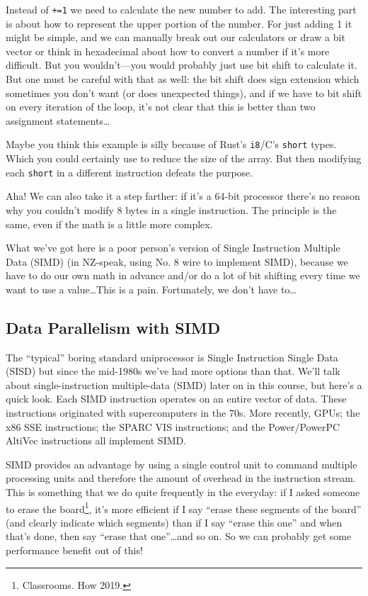 Instead of \texttt{+=1} we need to calculate the new number to add. The interesting part is about how to represent the upper portion of the number. For just adding 1 it might be simple, and we can manually break out our calculators or draw a bit vector or think in hexadecimal about how to convert a number if it's more difficult. But you wouldn't---you would probably just use bit shift to calculate it. But one must be careful with that as well: the bit shift does sign extension which sometimes you don't want (or does unexpected things), and if we have to bit shift on every iteration of the loop, it's not clear that this is better than two assignment statements\ldots

Maybe you think this example is silly because of Rust's \texttt{i8}/C's \texttt{short} types. Which you could certainly use to reduce the size of the array. But then modifying each \texttt{short} in a different instruction defeats the purpose.

Aha! We can also take it a step farther: if it's a 64-bit processor there's no reason why you couldn't modify 8 bytes in a single instruction. The principle is the same, even if the math is a little more complex.

What we've got here is a poor person's version of Single Instruction Multiple Data (SIMD) (in NZ-speak, using No. 8 wire to implement SIMD), because we have to do our own math in advance and/or do a lot of bit shifting every time we want to use a value\ldots This is a pain. Fortunately, we don't have to\ldots

\subsection*{Data Parallelism with SIMD}
The ``typical'' boring standard uniprocessor is Single Instruction Single Data (SISD) but since the mid-1980s we've had more options than that. We'll talk about single-instruction multiple-data (SIMD) later on in
this course, but here's a quick look. Each SIMD
instruction operates on an entire vector of data. These instructions
originated with supercomputers in the 70s. More recently, GPUs; the
x86 SSE instructions; the SPARC VIS instructions; and the
Power/PowerPC AltiVec instructions all implement SIMD.

SIMD provides an advantage by using a single control unit to command multiple processing units and therefore the amount of overhead in the instruction stream. This is something that we do quite frequently in the everyday: if I asked someone to erase the board\footnote{Classrooms. How 2019.}, it's more efficient if I say ``erase these segments of the board'' (and clearly indicate which segments) than if I say ``erase this one'' and when that's done, then say ``erase that one''\ldots and so on. So we can probably get some performance benefit out of this!

